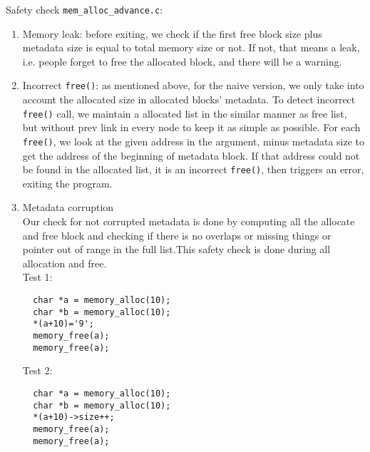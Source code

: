 \documentclass{article}
\begin{document}
\begin{flushleft}
Safety check \texttt{mem\_alloc\_advance.c}:

\begin{enumerate}
\item Memory leak: before exiting, we check if the first free block size plus metadata size is equal to total memory size or not. If not, that means a leak, i.e. people forget to free the allocated block, and there will be a warning.

\item Incorrect \texttt{free()}: as mentioned above, for the naive version, we only take into account the allocated size in allocated blocks' metadata. To detect incorrect \texttt{free()} call, we maintain a allocated list in the similar manner as free list, but without prev link in every node to keep it as simple as possible. For each \texttt{free()}, we look at the given address in the argument, minus metadata size to get the address of the beginning of metadata block. If that address could not be found in the allocated list, it is an incorrect \texttt{free()}, then triggers an error, exiting the program.

\item Metadata corruption\\
Our check for not corrupted metadata is done by computing all the allocate and free block and checking if there is no overlaps or missing things or pointer out of range in the full list.This safety check is done during all allocation and free.\\
Test 1:\\
\begin{lstlisting}
  char *a = memory_alloc(10);
  char *b = memory_alloc(10);
  *(a+10)='9';
  memory_free(a);
  memory_free(a);
\end{lstlisting}
Test 2:\\
\begin{lstlisting}
  char *a = memory_alloc(10);
  char *b = memory_alloc(10);
  *(a+10)->size++;
  memory_free(a);
  memory_free(a);
\end{lstlisting}

\end{enumerate}


\end{flushleft}
\end{document}

